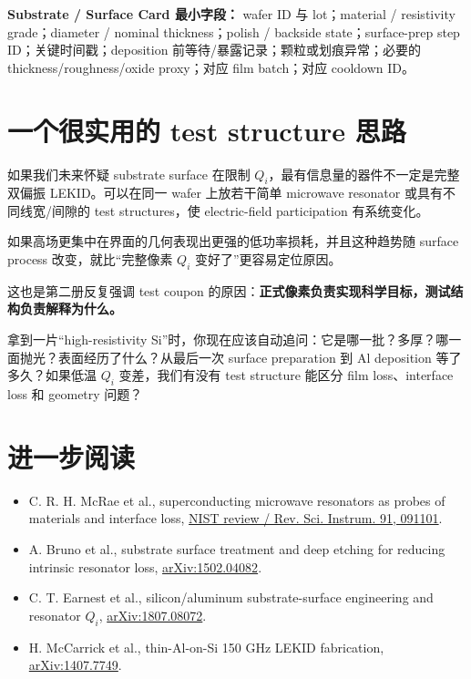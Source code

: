 \begin{measurebox}
\textbf{Substrate / Surface Card 最小字段：}
wafer ID 与 lot；material / resistivity grade；diameter / nominal thickness；polish / backside state；surface-prep step ID；关键时间戳；deposition 前等待/暴露记录；颗粒或划痕异常；必要的 thickness/roughness/oxide proxy；对应 film batch；对应 cooldown ID。
\end{measurebox}

\section{一个很实用的 test structure 思路}

如果我们未来怀疑 substrate surface 在限制 $Q_i$，最有信息量的器件不一定是完整双偏振 LEKID。可以在同一 wafer 上放若干简单 microwave resonator 或具有不同线宽/间隙的 test structures，使 electric-field participation 有系统变化。

如果高场更集中在界面的几何表现出更强的低功率损耗，并且这种趋势随 surface process 改变，就比“完整像素 $Q_i$ 变好了”更容易定位原因。

这也是第二册反复强调 test coupon 的原因：\textbf{正式像素负责实现科学目标，测试结构负责解释为什么。}

\begin{checkpointbox}
拿到一片“high-resistivity Si”时，你现在应该自动追问：它是哪一批？多厚？哪一面抛光？表面经历了什么？从最后一次 surface preparation 到 Al deposition 等了多久？如果低温 $Q_i$ 变差，我们有没有 test structure 能区分 film loss、interface loss 和 geometry 问题？
\end{checkpointbox}

\section*{进一步阅读}

\begin{itemize}
  \item C. R. H. McRae et al., superconducting microwave resonators as probes of materials and interface loss, \href{https://www.nist.gov/publications/materials-loss-measurements-using-superconducting-microwave-resonators}{NIST review / Rev. Sci. Instrum. 91, 091101}.
  \item A. Bruno et al., substrate surface treatment and deep etching for reducing intrinsic resonator loss, \href{https://arxiv.org/abs/1502.04082}{arXiv:1502.04082}.
  \item C. T. Earnest et al., silicon/aluminum substrate-surface engineering and resonator $Q_i$, \href{https://arxiv.org/abs/1807.08072}{arXiv:1807.08072}.
  \item H. McCarrick et al., thin-Al-on-Si 150 GHz LEKID fabrication, \href{https://arxiv.org/abs/1407.7749}{arXiv:1407.7749}.
\end{itemize}
